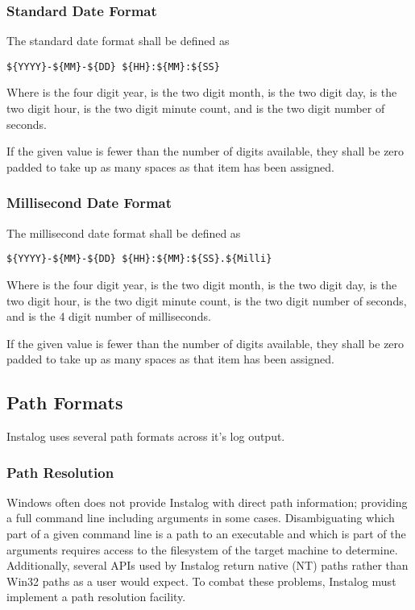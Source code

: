 \subsubsection{Standard Date Format} \label{stddate}
The standard date format shall be defined as
\begin{verbatim}
${YYYY}-${MM}-${DD} ${HH}:${MM}:${SS}
\end{verbatim}
Where  is the four digit year,  is the two digit month,
 is the two digit day,  is the two digit hour,  is the
two digit minute count, and  is the two digit number of seconds.

If the given value is fewer than the number of digits available, they shall be
zero padded to take up as many spaces as that item has been assigned.

\subsubsection{Millisecond Date Format} \label{millidate}
The millisecond date format shall be defined as
\begin{verbatim}
${YYYY}-${MM}-${DD} ${HH}:${MM}:${SS}.${Milli}
\end{verbatim}
Where  is the four digit year,  is the two digit month,
 is the two digit day,  is the two digit hour,  is the
two digit minute count,  is the two digit number of seconds, and
 is the 4 digit number of milliseconds.

If the given value is fewer than the number of digits available, they shall be
zero padded to take up as many spaces as that item has been assigned.

\subsection{Path Formats}
Instalog uses several path formats across it's log output.

\subsubsection{Path Resolution} \label{pathresolution}
Windows often does not provide Instalog with direct path information; providing
a full command line including arguments in some cases. Disambiguating which part
of a given command line is a path to an executable and which is part of the
arguments requires access to the filesystem of the target machine to determine.
Additionally, several APIs used by Instalog return native (NT) paths rather than
Win32 paths as a user would expect. To combat these problems, Instalog must
implement a path resolution facility.

